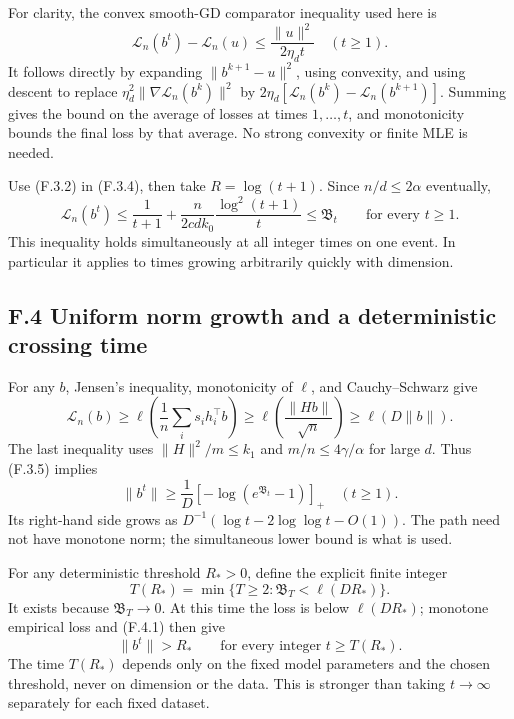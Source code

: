 \documentclass[
  11pt,
  a4paper,
]{article}
\begin{document}
For clarity, the convex smooth-GD comparator inequality used here is \[
\mathcal L_n(b^t)-\mathcal L_n(u)\le\frac{\|u\|^2}{2\eta_dt}
\quad(t\ge1).
\tag{F.3.4}
\] It follows directly by expanding \(\|b^{k+1}-u\|^2\), using
convexity, and using descent to replace
\(\eta_d^2\|\nabla\mathcal L_n(b^k)\|^2\) by
\(2\eta_d[\mathcal L_n(b^k)-\mathcal L_n(b^{k+1})]\). Summing gives the
bound on the average of losses at times \(1,\ldots,t\), and monotonicity
bounds the final loss by that average. No strong convexity or finite MLE
is needed.

Use (F.3.2) in (F.3.4), then take \(R=\log(t+1)\). Since
\(n/d\le2\alpha\) eventually, \[
\boxed{\quad
\mathcal L_n(b^t)
\le\frac1{t+1}+\frac{n}{2cdk_0}\frac{\log^2(t+1)}t
\le\mathfrak B_t\qquad\text{for every }t\ge1.
\quad}
\tag{F.3.5}
\] This inequality holds simultaneously at all integer times on one
event. In particular it applies to times growing arbitrarily quickly
with dimension.

\hypertarget{f.4-uniform-norm-growth-and-a-deterministic-crossing-time}{%
\subsection{F.4 Uniform norm growth and a deterministic crossing
time}\label{f.4-uniform-norm-growth-and-a-deterministic-crossing-time}}

For any \(b\), Jensen's inequality, monotonicity of \(\ell\), and
Cauchy--Schwarz give \[
\mathcal L_n(b)
\ge\ell\!\left(\frac1n\sum_i s_i h_i^\top b\right)
\ge\ell\!\left(\frac{\|Hb\|}{\sqrt n}\right)
\ge\ell(D\|b\|).
\tag{F.4.1}
\] The last inequality uses \(\|H\|^2/m\le k_1\) and
\(m/n\le4\gamma/\alpha\) for large \(d\). Thus (F.3.5) implies \[
\boxed{\quad
\|b^t\|\ge\frac1D
\left[-\log(e^{\mathfrak B_t}-1)\right]_+
\quad(t\ge1).\quad}
\tag{F.4.2}
\] Its right-hand side grows as \(D^{-1}(\log t-2\log\log t-O(1))\). The
path need not have monotone norm; the simultaneous lower bound is what
is used.

For any deterministic threshold \(R_*>0\), define the explicit finite
integer \[
T(R_*)=\min\{T\ge2:\mathfrak B_T<\ell(DR_*)\}.
\tag{F.4.3}
\] It exists because \(\mathfrak B_T\to0\). At this time the loss is
below \(\ell(DR_*)\); monotone empirical loss and (F.4.1) then give \[
\|b^t\|>R_*\qquad\text{for every integer }t\ge T(R_*).
\tag{F.4.4}
\] The time \(T(R_*)\) depends only on the fixed model parameters and
the chosen threshold, never on dimension or the data. This is stronger
than taking \(t\to\infty\) separately for each fixed dataset.
\end{document}

